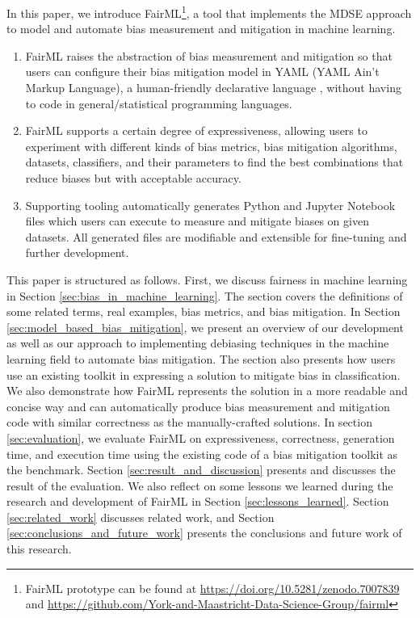 \documentclass[sigconf]{acmart}
\begin{document}
	In this paper, we introduce FairML\footnote{FairML prototype can be found at \url{https://doi.org/10.5281/zenodo.7007839} and \url{https://github.com/York-and-Maastricht-Data-Science-Group/fairml}}, a tool that implements the MDSE approach to model and automate bias measurement and mitigation in machine learning. 
	\begin{enumerate}
		\item FairML raises the abstraction of bias measurement and mitigation so that users can configure their bias mitigation model in YAML (YAML Ain't Markup Language), a human-friendly declarative language \cite{evans2017yaml}, without having to code in general/statistical programming languages.
		\item FairML supports a certain degree of expressiveness, allowing users to experiment with different kinds of bias metrics, bias mitigation algorithms, datasets, classifiers, and their parameters to find the best combinations that reduce biases but with acceptable accuracy.
		\item Supporting tooling automatically generates Python and Jupyter Notebook files which users can execute to measure and mitigate biases on given datasets. All generated files are modifiable and extensible for fine-tuning and further development. 
	\end{enumerate}
	
	This paper is structured as follows. First, we discuss fairness in machine learning in Section \ref{sec:bias_in_machine_learning}. The section covers the definitions of some related terms, real examples, bias metrics, and bias mitigation. In Section \ref{sec:model_based_bias_mitigation}, we present an overview of our development as well as our approach to implementing debiasing techniques in the machine learning field to automate bias mitigation. 
	The section also presents how users use an existing toolkit in expressing a solution to mitigate bias in classification. We also demonstrate how FairML represents the solution in a more readable and concise way and can automatically produce bias measurement and mitigation code with similar correctness as the manually-crafted solutions.
	In section \ref{sec:evaluation}, we evaluate FairML on expressiveness, correctness, generation time, and execution time using the existing code of a bias mitigation toolkit as the benchmark. Section \ref{sec:result_and_discussion} presents and discusses the result of the evaluation. 
	We also reflect on some lessons we learned during the research and development of FairML in Section \ref{sec:lessons_learned}. 
	Section \ref{sec:related_work} discusses related work, and Section \ref{sec:conclusions_and_future_work} presents the conclusions and future work of this research.
	
\end{document}
